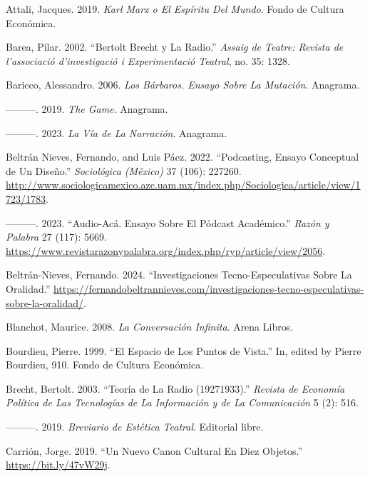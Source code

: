 \documentclass[
]{interact}
\newlength{\cslhangindent}
\newenvironment{CSLReferences}[2] %
 {\begin{list}{}{%
  \setlength{\itemindent}{0pt}
  \setlength{\leftmargin}{0pt}
  \setlength{\parsep}{0pt}
  \ifodd #1
   \setlength{\leftmargin}{\cslhangindent}
   \setlength{\itemindent}{-1\cslhangindent}
  \fi
  \setlength{\itemsep}{#2\baselineskip}}}
 {\end{list}}
\begin{document}
\label{refs}
\begin{CSLReferences}{1}{0}
Attali, Jacques. 2019. \emph{Karl Marx o El Espíritu Del Mundo}. Fondo
de Cultura Económica.

Barea, Pilar. 2002. {``Bertolt Brecht y La Radio.''} \emph{Assaig de
Teatre: Revista de l'associació d'investigació i Experimentació
Teatral}, no. 35: 1328.

Baricco, Alessandro. 2006. \emph{Los Bárbaros. Ensayo Sobre La
Mutación}. Anagrama.

---------. 2019. \emph{The Game}. Anagrama.

---------. 2023. \emph{La Vía de La Narración}. Anagrama.

Beltrán Nieves, Fernando, and Luis Páez. 2022. {``Podcasting, Ensayo
Conceptual de Un Diseño.''} \emph{Sociológica (México)} 37 (106):
227260.
\url{http://www.sociologicamexico.azc.uam.mx/index.php/Sociologica/article/view/1723/1783}.

---------. 2023. {``Audio-Acá. Ensayo Sobre El Pódcast Académico.''}
\emph{Razón y Palabra} 27 (117): 5669.
\url{https://www.revistarazonypalabra.org/index.php/ryp/article/view/2056}.

Beltrán-Nieves, Fernando. 2024. {``Investigaciones Tecno-Especulativas
Sobre La Oralidad.''}
\url{https://fernandobeltrannieves.com/investigaciones-tecno-especulativas-sobre-la-oralidad/}.

Blanchot, Maurice. 2008. \emph{La Conversación Infinita}. Arena Libros.

Bourdieu, Pierre. 1999. {``El Espacio de Los Puntos de Vista.''} In,
edited by Pierre Bourdieu, 910. Fondo de Cultura Económica.

Brecht, Bertolt. 2003. {``Teoría de La Radio (1927{\textendash}1933).''}
\emph{Revista de Economía Política de Las Tecnologías de La Información
y de La Comunicación} 5 (2): 516.

---------. 2019. \emph{Breviario de Estética Teatral}. Editorial libre.

Carrión, Jorge. 2019. {``Un Nuevo Canon Cultural En Diez Objetos.''}
\url{https://bit.ly/47vW29j}.


\end{CSLReferences}
\end{document}
